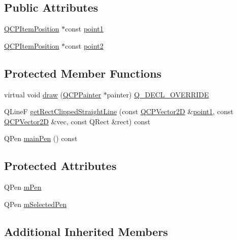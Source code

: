 \subsection*{Public Attributes}
\begin{DoxyCompactItemize}
\item 
\hyperlink{class_q_c_p_item_position}{Q\+C\+P\+Item\+Position} $\ast$const \hyperlink{class_q_c_p_item_straight_line_ac131a6ffe456f2cc7364dce541fe0120}{point1}
\item 
\hyperlink{class_q_c_p_item_position}{Q\+C\+P\+Item\+Position} $\ast$const \hyperlink{class_q_c_p_item_straight_line_ad26c0a732e471f63f75d481dcd48cfc9}{point2}
\end{DoxyCompactItemize}
\subsection*{Protected Member Functions}
\begin{DoxyCompactItemize}
\item 
virtual void \hyperlink{class_q_c_p_item_straight_line_acbc84ad219bf4845152e4e2202fcaa3c}{draw} (\hyperlink{class_q_c_p_painter}{Q\+C\+P\+Painter} $\ast$painter) \hyperlink{qcustomplot_8h_a42cc5eaeb25b85f8b52d2a4b94c56f55}{Q\+\_\+\+D\+E\+C\+L\+\_\+\+O\+V\+E\+R\+R\+I\+DE}
\item 
Q\+LineF \hyperlink{class_q_c_p_item_straight_line_ae1de3d4121c06e5ffea4961722a54f5e}{get\+Rect\+Clipped\+Straight\+Line} (const \hyperlink{class_q_c_p_vector2_d}{Q\+C\+P\+Vector2D} \&\hyperlink{class_q_c_p_item_straight_line_ac131a6ffe456f2cc7364dce541fe0120}{point1}, const \hyperlink{class_q_c_p_vector2_d}{Q\+C\+P\+Vector2D} \&vec, const Q\+Rect \&rect) const
\item 
Q\+Pen \hyperlink{class_q_c_p_item_straight_line_a5b1a39cfc54c3e22f65de2958d40eb59}{main\+Pen} () const
\end{DoxyCompactItemize}
\subsection*{Protected Attributes}
\begin{DoxyCompactItemize}
\item 
Q\+Pen \hyperlink{class_q_c_p_item_straight_line_a15106ddc2ebd73ed5c1bc57aa92bee8f}{m\+Pen}
\item 
Q\+Pen \hyperlink{class_q_c_p_item_straight_line_a0307a0d56a018656adbf798bc84c2a4b}{m\+Selected\+Pen}
\end{DoxyCompactItemize}
\subsection*{Additional Inherited Members}


